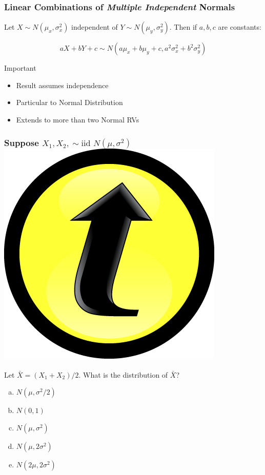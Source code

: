 \documentclass[handout]{beamer}
\begin{document}
\begin{frame}
  \frametitle{Linear Combinations of \emph{Multiple Independent} Normals}
Let $X \sim N(\mu_x, \sigma^2_x)$ independent of $Y \sim N(\mu_y, \sigma^2_y)$. Then if $a,b,c$ are constants:

$$\boxed{aX + bY +c \sim N(a\mu_x + b\mu_y + c, a^2 \sigma_x^2 + b^2 \sigma_y^2)}$$



\begin{block}{Important}
	\begin{itemize}
		\item Result assumes independence
		\item Particular to Normal Distribution
		\item Extends to more than two Normal RVs
	\end{itemize}
\end{block}

\end{frame}
\begin{frame}
\frametitle{Suppose $X_1, X_2, \sim \mbox{iid } N(\mu, \sigma^2)$ \hfill \includegraphics[scale = 0.05]{./images/clicker}}

Let $\bar{X} = (X_1 + X_2)/2$. What is the distribution of $\bar{X}$?
\begin{enumerate}[(a)]
\item $N(\mu, \sigma^2/2)$
\item $N(0,1)$
\item $N(\mu, \sigma^2)$
\item $N(\mu, 2\sigma^2)$
\item $N(2\mu, 2\sigma^2)$
\end{enumerate}

\end{frame}
\end{document}
